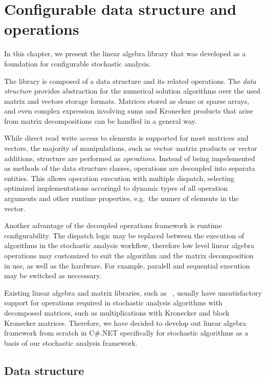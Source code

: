 \chapter{Configurable data structure and operations}
\label{chap:operations}

In this chapter, we present the linear algebra library that was
developed as a foundation for configurable stochastic analysis.

The library is composed of a data structure and its related
operations. The \emph{data structure} provides abstraction for the
numerical solution algorithms over the used matrix and vectors storage
formats. Matrices stored as dense or sparse arrays, and even complex
expression involving sums and Kronecker products that arise from
matrix decompositions can be handled in a general way.

While direct read write access to elements is supported for most
matrices and vectors, the majority of manipulations, such as
vector--matrix products or vector additions, structure are performed
as \emph{operations}. Instead of being impelemented as methods of the
data structure classes, operations are decoupled into separata
entities. This allows operation execution with multiple dispatch,
selecting optimized implementations accoringd to dynamic types of all
operation arguments and other runtime properties, e.g.~the numer of
elements in the vector.

Another advantage of the decoupled operations framework is runtime
configurability. The dispatch logic may be replaced between the
execution of algorithms in the stochastic analysis workflow, therefore
low level linear algebra operations may customized to suit the
algorithm and the matrix decomposition in use, as well as the
hardware. For example, paralell and sequential execution may be
switched as neccessary.

Existing linear algebra and matrix libraries, such as%
~\citep{mathdotnet,bluebit,extremeopt,eigen,sanderson2010armadillo},
usually have unsatisfactory support for operations required in
stochastic analysis algorithms with decomposed matrices, such as
multiplications with Kronecker and block Kronecker
matrices. Therefore, we have decided to develop out linear algebra
framework from scratch in C\#.NET specifically for stochastic
algorithms as a basis of our stochastic analysis framework.

\section{Data structure}

